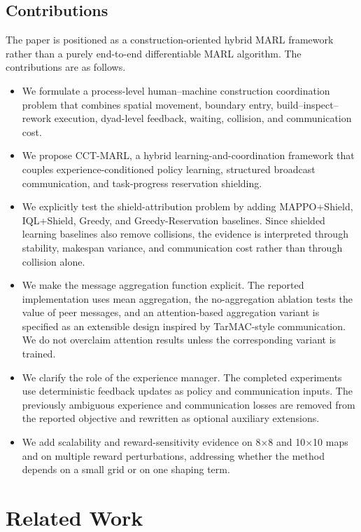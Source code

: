 \documentclass[preprint,12pt]{elsarticle}
\begin{document}
\subsection{Contributions}

The paper is positioned as a construction-oriented hybrid MARL framework rather than a purely end-to-end differentiable MARL algorithm. The contributions are as follows.
\begin{itemize}
    \item We formulate a process-level human--machine construction coordination problem that combines spatial movement, boundary entry, build--inspect--rework execution, dyad-level feedback, waiting, collision, and communication cost.
    \item We propose CCT-MARL, a hybrid learning-and-coordination framework that couples experience-conditioned policy learning, structured broadcast communication, and task-progress reservation shielding.
    \item We explicitly test the shield-attribution problem by adding MAPPO+Shield, IQL+Shield, Greedy, and Greedy-Reservation baselines. Since shielded learning baselines also remove collisions, the evidence is interpreted through stability, makespan variance, and communication cost rather than through collision alone.
    \item We make the message aggregation function explicit. The reported implementation uses mean aggregation, the no-aggregation ablation tests the value of peer messages, and an attention-based aggregation variant is specified as an extensible design inspired by TarMAC-style communication. We do not overclaim attention results unless the corresponding variant is trained.
    \item We clarify the role of the experience manager. The completed experiments use deterministic feedback updates as policy and communication inputs. The previously ambiguous experience and communication losses are removed from the reported objective and rewritten as optional auxiliary extensions.
    \item We add scalability and reward-sensitivity evidence on 8$\times$8 and 10$\times$10 maps and on multiple reward perturbations, addressing whether the method depends on a small grid or on one shaping term.
\end{itemize}

\section{Related Work}
\end{document}
